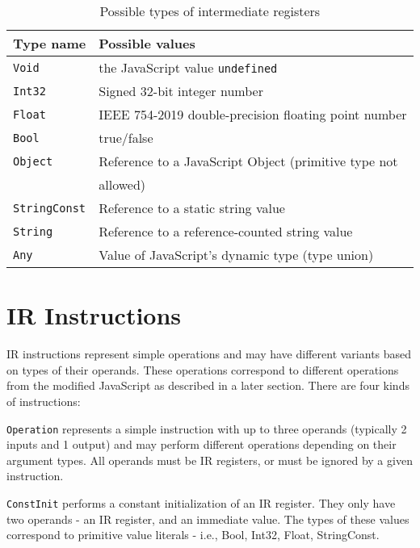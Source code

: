 \begin{table}[H]
    \centering
    \begin{tabular}{l | l}
        Type name   & Possible values                                                \\\hline
        \texttt{Void}        & the JavaScript value \texttt{undefined}                        \\
        \texttt{Int32}       & Signed 32-bit integer number                                   \\
        \texttt{Float}       & IEEE 754-2019 double-precision floating point number          \\
        \texttt{Bool}        & true/false                                                     \\
        \texttt{Object}      & Reference to a JavaScript Object (primitive type not \\
                             & allowed)  \\
        \texttt{StringConst} & Reference to a static string value                             \\
        \texttt{String}      & Reference to a reference-counted string value                  \\
        \texttt{Any}         & Value of JavaScript's dynamic type (type union)
    \end{tabular}
    \caption{Possible types of intermediate registers}
    \label{tab:types}
\end{table}


\section{IR Instructions}

IR instructions represent simple operations and may have different variants based on types of their operands. These operations correspond to different operations from the modified JavaScript as described in a later section. There are four kinds of instructions:


\texttt{Operation} represents a simple instruction with up to three operands (typically 2 inputs and 1 output) and may perform different operations depending on their argument types. All operands must be IR registers, or must be ignored by a given instruction.

\texttt{ConstInit} performs a constant initialization of an IR register. They only have two operands - an IR register, and an immediate value. The types of these values correspond to primitive value literals - i.e., Bool, Int32, Float, StringConst.

